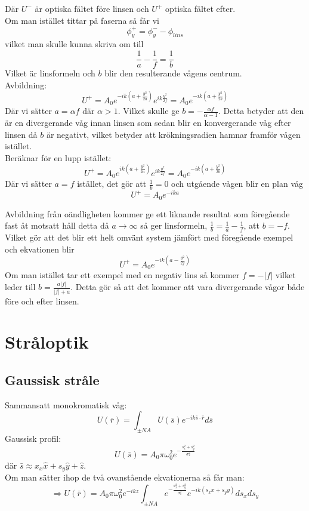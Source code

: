 \documentclass{article}
\begin{document}
    Där $U^-$ är optiska fältet före linsen och $U^+$ optiska fältet efter.\\

    Om man istället tittar på faserna så får vi
    \[
      \phi_y^+=\phi_y^--\phi_{lins}
    \]
    vilket man skulle kunna skriva om till
    \[
      \frac{1}{a}-\frac{1}{f}=\frac{1}{b}
    \]
    Vilket är linsformeln och $b$ blir den resulterande vågens centrum.\\

    Avbildning:
    \[
      U^+=A_0e^{-ik(a+\frac{y^2}{2a})}e^{ik\frac{y^2}{2f}}=A_0e^{-ik(a+\frac{y^2}{2b})}
    \]
    Där vi sätter $a=\alpha f$ där $\alpha>1$. Vilket skulle ge $b=-\frac{\alpha f}{\alpha -1}$. Detta betyder att den är en divergerande våg innan linsen som sedan blir en konvergerande våg efter linsen då $b$ är negativt, vilket betyder att krökningsradien hamnar framför vågen istället.\\

    Beräknar för en lupp istället:
    \[
      U^+=A_0e^{ik(a+\frac{y^2}{2a})}e^{ik\frac{y^2}{2f}}=A_0e^{-ik(a+\frac{y^2}{2b})}
    \]
    Där vi sätter $a=f$ istället, det gör att $\frac{1}{b}=0$ och utgående vågen blir en plan våg
    \[
      U^+=A_0e^{-ika}
    \]

    Avbildning från oändligheten kommer ge ett liknande resultat som föregående fast åt motsatt håll detta då $a\rightarrow\infty$ så ger linsformeln, $\frac{1}{b}=\frac{1}{a}-\frac{1}{f}$, att $b=-f$. Vilket gör att det blir ett helt omvänt system jämfört med föregående exempel och ekvationen blir
    \[
      U^+=A_0e^{-ik(a-\frac{y^2}{2f})}
    \]
    Om man istället tar ett exempel med en negativ lins så kommer $f=-|f|$ vilket leder till $b=\frac{a|f|}{|f|+a}$. Detta gör så att det kommer att vara divergerande vågor både före och efter linsen.

\newpage
\section{Stråloptik}
  \subsection{Gaussisk stråle}
    Sammansatt monokromatisk våg:
    \[
      U(\bar{r})=\int_{\pm NA}U(\bar{s})e^{-ik\bar{s}\cdot\bar{r}}d\bar{s}
    \]
    Gaussisk profil:
    \[
      U(\bar{s})=A_0\pi \omega_0^2e^{-\frac{s_x^2+s_y^2}{\sigma_s^2}}
    \]
    där $\bar{s}\approx x_x\hat{x}+s_y\hat{y}+\hat{z}$.\\
    Om man sätter ihop de två ovanstående ekvationerna så får man:
    \[
      \Rightarrow U(\bar{r})=A_0\pi\omega_0^2e^{-ikz}\int_{\pm NA}e^{-\frac{s_x^2+s_y^2}{\sigma_s^2}}e^{-ik(s_xx+s_yy)}ds_xds_y
    \]
\end{document}
